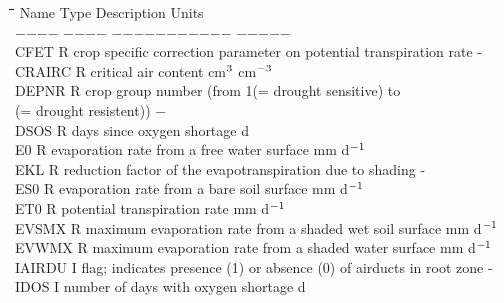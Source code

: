 \documentclass[11pt]{article}
\begin{document}
\begin{tabbing}
\hspace{1.27cm}\=\hspace{1.27cm}\=\hspace{1.27cm}\=\hspace{1.27cm}\=%
\hspace{1.27cm}\=\hspace{1.27cm}\=\hspace{1.27cm}\=\hspace{1.27cm}\=%
\hspace{1.27cm}\=\hspace{1.27cm}\=\kill
Name    \> \> Type   \> Description                                        \> \> \> \> \> \> \> Units\\
$-$$-$$-$$-$    \> \> $-$$-$$-$$-$   \> $-$$-$$-$$-$$-$$-$$-$$-$$-$$-$$-$                                        \> \> \> \> \> \> \> $-$$-$$-$$-$$-$\\
CFET\> \> R\> crop specific correction parameter on potential transpiration rate\> \> \> \> \> \> \> -\\
CRAIRC\> \> R\> critical air content\> \> \> \> \> \> \> cm$^{{\rm 3}}$ cm$^{{\rm -3}}$\\
DEPNR\> \> R   \> crop group number (from 1(= drought sensitive) to \\
\>\> (= drought resistent))   \> \> \> \> \> \> \> $-$\\
DSOS\> \> R\> days since oxygen shortage\> \> \> \> \> \> \> d\\
E0\> \> R\> evaporation rate from a free water surface\> \> \> \> \> \> \> mm d$^{{\rm -1}}$\\
EKL\> \> R\> reduction factor of the evapotranspiration due to shading\> \> \> \> \> \> \> -\\
ES0\> \> R\> evaporation rate from a bare soil surface\> \> \> \> \> \> \> mm d$^{{\rm -1}}$\\
ET0\> \> R\> potential transpiration rate\> \> \> \> \> \> \> mm d$^{{\rm -1}}$\\
EVSMX\> \> R\> maximum evaporation rate from a shaded wet soil surface\> \> \> \> \> \> \> mm d$^{{\rm -1}}$\\
EVWMX\> \> R\> maximum evaporation rate from a shaded water surface\> \> \> \> \> \> \> mm d$^{{\rm -1}}$\\
IAIRDU\> \> I\> flag; indicates presence (1) or absence (0) of airducts in root zone\> \> \> \> \> \> \> -\\
IDOS\> \> I\> number of days with oxygen shortage\> \> \> \> \> \> \> d\\

\end{tabbing}
\end{document}
